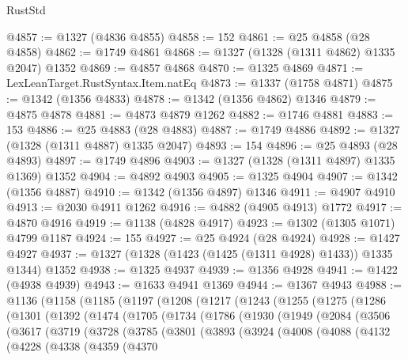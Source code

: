 \begin{lexlean}{RustStd}
\begin{coremodule}
@4857 := @1327 (@4836 @4855)
@4858 := 152
@4861 := @25 @4858 (@28 @4858)
@4862 := @1749 @4861
@4868 := @1327 (@1328 (@1311 @4862) @1335 @2047) @1352
@4869 := @4857 @4868
@4870 := @1325 @4869
@4871 := LexLeanTarget.RustSyntax.Item.natEq
@4873 := @1337 (@1758 @4871)
@4875 := @1342 (@1356 @4833)
@4878 := @1342 (@1356 @4862) @1346
@4879 := @4875 @4878
@4881 := @4873 @4879 @1262
@4882 := @1746 @4881
@4883 := 153
@4886 := @25 @4883 (@28 @4883)
@4887 := @1749 @4886
@4892 := @1327 (@1328 (@1311 @4887) @1335 @2047)
@4893 := 154
@4896 := @25 @4893 (@28 @4893)
@4897 := @1749 @4896
@4903 := @1327 (@1328 (@1311 @4897) @1335 @1369) @1352
@4904 := @4892 @4903
@4905 := @1325 @4904
@4907 := @1342 (@1356 @4887)
@4910 := @1342 (@1356 @4897) @1346
@4911 := @4907 @4910
@4913 := @2030 @4911 @1262
@4916 := @4882 (@4905 @4913) @1772
@4917 := @4870 @4916
@4919 := @1138 (@4828 @4917)
@4923 := @1302 (@1305 @1071) @4799 @1187
@4924 := 155
@4927 := @25 @4924 (@28 @4924)
@4928 := @1427 @4927
@4937 := @1327 (@1328 (@1423 (@1425 (@1311 @4928) @1433)) @1335 @1344) @1352
@4938 := @1325 @4937
@4939 := @1356 @4928
@4941 := @1422 (@4938 @4939)
@4943 := @1633 @4941 @1369
@4944 := @1367 @4943
@4988 := @1136
    (@1158
      (@1185
        (@1197
          (@1208
            (@1217
              (@1243
                (@1255
                  (@1275
                    (@1286
                      (@1301
                        (@1392
                          (@1474
                            (@1705
                              (@1734
                                (@1786
                                  (@1930
                                    (@1949
                                      (@2084
                                        (@3506
                                          (@3617
                                            (@3719
                                              (@3728
                                                (@3785
                                                  (@3801
                                                    (@3893
                                                      (@3924
                                                        (@4008
                                                          (@4088
                                                            (@4132
                                                              (@4228
                                                                (@4338
                                                                  (@4359
                                                                    (@4370

\end{coremodule}
\end{lexlean}
